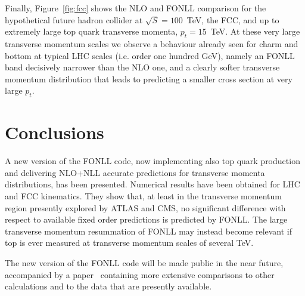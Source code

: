 \documentclass{PoS}
\begin{document}
Finally, Figure~\ref{fig:fcc} shows the NLO and FONLL comparison for the
hypothetical future hadron collider at $\sqrt{S} = 100$~TeV, the FCC, and up to
extremely large top quark transverse momenta, $p_t = 15$~TeV. At these very
large
transverse momentum scales we observe a behaviour already seen for charm and
bottom at typical  LHC scales (i.e. order one hundred GeV), namely an FONLL band decisively narrower than the
NLO one, and a clearly softer transverse momentum distribution that leads to
predicting a smaller cross section at very large $p_t$.

\section{Conclusions}

A new version of the FONLL code, now implementing also top quark production and
delivering NLO+NLL accurate predictions for transverse momenta distributions,
has been presented.  Numerical results have been obtained for LHC and FCC
kinematics. They show that, at least in the transverse momentum region presently
explored by ATLAS and CMS, no significant difference  with respect to available
fixed order predictions is predicted by FONLL. The large transverse momentum
resummation of FONLL may instead become relevant if top is ever measured at
transverse momentum scales of several TeV.

The new version of the FONLL code will be made public in the near future,
accompanied by a paper~\cite{CDR} containing more extensive comparisons to other
calculations and to the data that are presently available.
\end{document}
